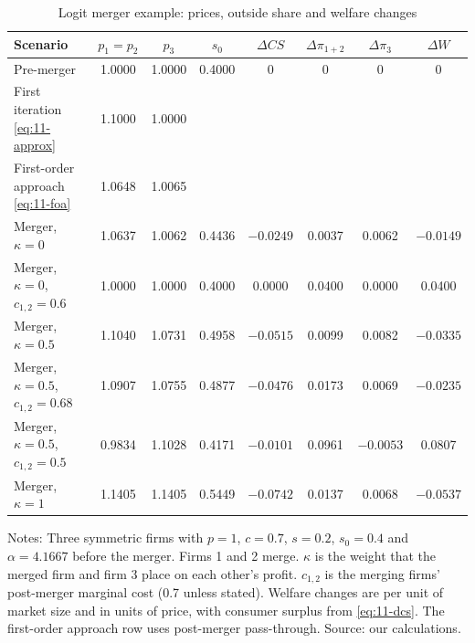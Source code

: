 \begin{table}[htbp]
\centering
\caption{Logit merger example: prices, outside share and welfare changes}
\label{tab:11-logitex}
\small
\begin{tabular}{@{}lccccccc@{}}
\toprule
Scenario & $p_1 = p_2$ & $p_3$ & $s_0$ & $\Delta\mathit{CS}$ & $\Delta\pi_{1+2}$ & $\Delta\pi_3$ & $\Delta W$ \\
\midrule
Pre-merger                                   & 1.0000 & 1.0000 & 0.4000 & 0       & 0       & 0       & 0       \\
First iteration \eqref{eq:11-approx}         & 1.1000 & 1.0000 &        &         &         &         &         \\
First-order approach \eqref{eq:11-foa}       & 1.0648 & 1.0065 &        &         &         &         &         \\
Merger, $\kappa = 0$                         & 1.0637 & 1.0062 & 0.4436 & $-0.0249$ & 0.0037 & 0.0062 & $-0.0149$ \\
Merger, $\kappa = 0$, $c_{1,2} = 0.6$         & 1.0000 & 1.0000 & 0.4000 & 0.0000  & 0.0400  & 0.0000  & 0.0400  \\
Merger, $\kappa = 0.5$                       & 1.1040 & 1.0731 & 0.4958 & $-0.0515$ & 0.0099 & 0.0082 & $-0.0335$ \\
Merger, $\kappa = 0.5$, $c_{1,2} = 0.68$      & 1.0907 & 1.0755 & 0.4877 & $-0.0476$ & 0.0173 & 0.0069 & $-0.0235$ \\
Merger, $\kappa = 0.5$, $c_{1,2} = 0.5$       & 0.9834 & 1.1028 & 0.4171 & $-0.0101$ & 0.0961 & $-0.0053$ & 0.0807 \\
Merger, $\kappa = 1$                         & 1.1405 & 1.1405 & 0.5449 & $-0.0742$ & 0.0137 & 0.0068 & $-0.0537$ \\
\bottomrule
\end{tabular}

\smallskip
\begin{minipage}{0.95\linewidth}
\footnotesize
Notes: Three symmetric firms with $p = 1$, $c = 0.7$, $s = 0.2$, $s_0 = 0.4$ and $\alpha = 4.1667$ before the merger.
Firms 1 and 2 merge. $\kappa$ is the weight that the merged firm and firm 3 place on each other's profit. $c_{1,2}$ is
the merging firms' post-merger marginal cost (0.7 unless stated). Welfare changes are per unit of market size and in
units of price, with consumer surplus from \eqref{eq:11-dcs}. The first-order approach row uses post-merger
pass-through. Source: our calculations.
\end{minipage}
\end{table}

